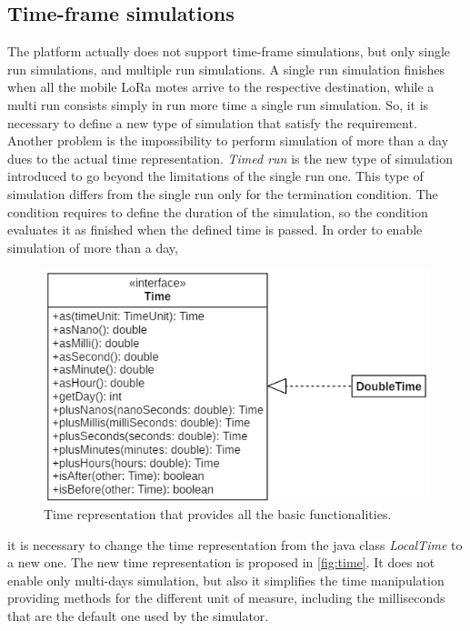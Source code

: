 \subsection*{Time-frame simulations}
The platform actually does not support time-frame simulations, but only single run simulations, and multiple run simulations.
A single run simulation finishes when all the mobile LoRa motes arrive to the respective destination, while a multi run consists simply in run more time a single run simulation.
So, it is necessary to define a new type of simulation that satisfy the requirement.
Another problem is the impossibility to perform simulation of more than a day dues to the actual time representation.
\textit{Timed run} is the new type of simulation introduced to go beyond the limitations of the single run one. 
This type of simulation differs from the single run only for the termination condition. 
The condition requires to define the duration of the simulation, so the condition evaluates it as finished when the defined time is passed.
In order to enable simulation of more than a day, 
%   
\begin{figure}[!b]
    \centering
    \includegraphics{figures/time.png}
    \caption[Time representation in DingNet simulator]{Time representation that provides all the basic functionalities.}
    \label{fig:time}
\end{figure}
% 
it is necessary to change the time representation from the java class \mbox{\textit{LocalTime}} to a new one.
The new time representation is proposed in \autoref{fig:time}.
It does not enable only multi-days simulation, but also it simplifies the time manipulation providing methods for the different unit of measure, including the milliseconds that are the default one used by the simulator.


